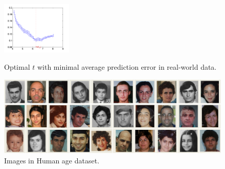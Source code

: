 \documentclass[10pt,journal,cspaper,compsoc]{IEEEtran}
\begin{document}
{\begin{figure}
\begin{center}
{\includegraphics[width=0.3\textwidth]{iqa_model2.png}}
  \caption{Optimal $t$ with minimal average prediction error in real-world data.} \label{realoptimal}
\end{center}
\end{figure}

\begin{figure}[h]
 \begin{center}
\includegraphics[width=0.8\linewidth]{agedataset.png}
  \caption{Images in Human age dataset.} \label{agedataset}
\end{center}
\end{figure}


}
\end{document}
